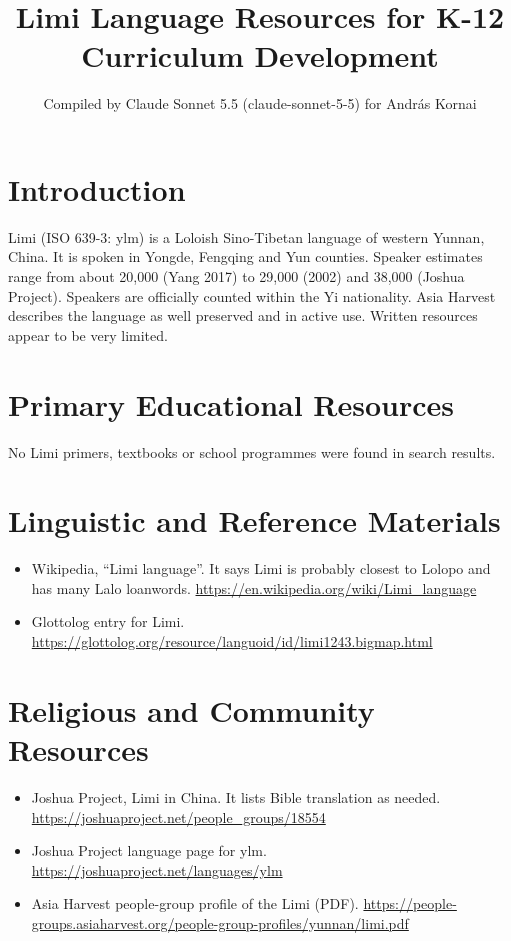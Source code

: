 \documentclass[12pt]{article}
\title{Limi Language Resources for K-12 Curriculum Development}
\author{Compiled by Claude Sonnet 5.5 (claude-sonnet-5-5) for Andr\'as Kornai}
\date{}
\begin{document}
\maketitle

\section{Introduction}
Limi (ISO 639-3: ylm) is a Loloish Sino-Tibetan language of western Yunnan, China. It is spoken in Yongde, Fengqing and Yun counties. Speaker estimates range from about 20,000 (Yang 2017) to 29,000 (2002) and 38,000 (Joshua Project). Speakers are officially counted within the Yi nationality. Asia Harvest describes the language as well preserved and in active use. Written resources appear to be very limited.

\section{Primary Educational Resources}
No Limi primers, textbooks or school programmes were found in search results.

\section{Linguistic and Reference Materials}
\begin{itemize}
\item Wikipedia, ``Limi language''. It says Limi is probably closest to Lolopo and has many Lalo loanwords. \url{https://en.wikipedia.org/wiki/Limi_language}
\item Glottolog entry for Limi. \url{https://glottolog.org/resource/languoid/id/limi1243.bigmap.html}
\end{itemize}

\section{Religious and Community Resources}
\begin{itemize}
\item Joshua Project, Limi in China. It lists Bible translation as needed. \url{https://joshuaproject.net/people_groups/18554}
\item Joshua Project language page for ylm. \url{https://joshuaproject.net/languages/ylm}
\item Asia Harvest people-group profile of the Limi (PDF). \url{https://people-groups.asiaharvest.org/people-group-profiles/yunnan/limi.pdf}
\end{itemize}
\end{document}
